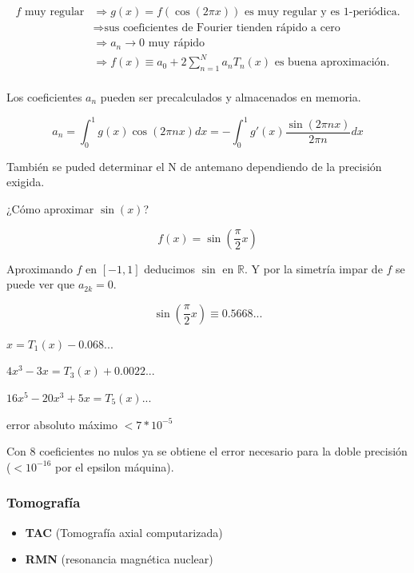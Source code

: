 		$$
		\begin{aligned}
		f \text{ muy regular} & \Rightarrow g(x) = f(\cos (2 \pi x))\text{ es muy regular y es 1-periódica.} \\
		& \Rightarrow \text{sus coeficientes de Fourier tienden rápido a cero} \\
		& \Rightarrow a_n \rightarrow 0 \text{ muy rápido} \\
		& \Rightarrow f(x) \equiv a_0 + 2 \sum\limits^{N}_{n=1} a_n T_n (x) \text{ es buena aproximación.} \\
		\end{aligned}
		$$

		\begin{obs}
			Los coeficientes $a_n$ pueden ser precalculados y almacenados en memoria.

			$$ a_n = \int^{1}_{0} g(x) \cos (2 \pi n x) dx = - \int^{1}_{0} g'(x) \frac{\sin (2 \pi n x)}{2 \pi n} dx $$

			También se puded determinar el N de antemano dependiendo de la precisión exigida.
		\end{obs}


		\begin{example}{¿Cómo aproximar $\sin (x)$?}

			$$f(x) = \sin(\frac{\pi}{2} x) $$

			Aproximando $f$ en $[-1,1]$ deducimos $\sin$ en $\mathbb{R}$. Y por la simetría impar de $f$ se puede ver que $a_{2k} = 0$.

			$$\sin (\frac{\pi}{2} x) \equiv 0.5668...$$

			$x = T_1 (x) - 0.068 ...$

			$4x^3 - 3x = T_3 (x) + 0.0022 ...$

			$16x^5 - 20x^3 + 5x = T_5(x) ... $

			error absoluto máximo $< 7 * 10^{-5}$

			Con 8 coeficientes no nulos ya se obtiene el error necesario para la doble precisión ($ < 10^{-16}$ por el epsilon máquina).


		\end{example}

\subsubsection{Tomografía}
\begin{itemize}
	\item \textbf{TAC} (Tomografía axial computarizada)
	\item \textbf{RMN} (resonancia magnética nuclear)
\end{itemize}

